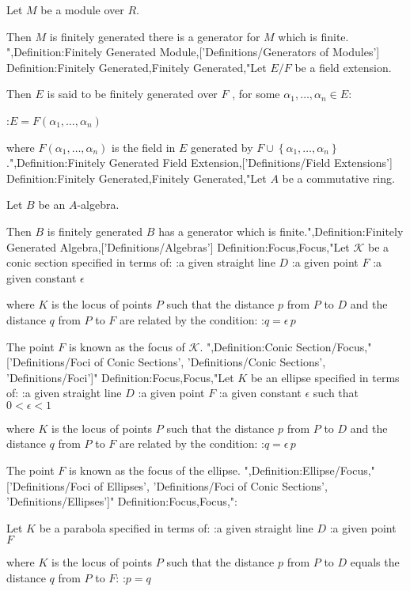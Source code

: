Let $M$ be a module over $R$.


Then $M$ is finitely generated  there is a generator for $M$ which is finite.
",Definition:Finitely Generated Module,['Definitions/Generators of Modules']
Definition:Finitely Generated,Finitely Generated,"Let $E / F$ be a field extension.


Then $E$ is said to be finitely generated over $F$ , for some $\alpha_1, \ldots, \alpha_n \in E$:

:$E = F \left({\alpha_1, \ldots, \alpha_n}\right)$ 

where $F \left({\alpha_1, \ldots, \alpha_n}\right)$ is the field in $E$ generated by $F \cup \left\{{\alpha_1, \ldots, \alpha_n}\right\}$.",Definition:Finitely Generated Field Extension,['Definitions/Field Extensions']
Definition:Finitely Generated,Finitely Generated,"Let $A$ be a commutative ring.

Let $B$ be an $A$-algebra.


Then $B$ is finitely generated  $B$ has a generator which is finite.",Definition:Finitely Generated Algebra,['Definitions/Algebras']
Definition:Focus,Focus,"Let $\mathcal K$ be a conic section specified in terms of:
:a given straight line $D$
:a given point $F$
:a given constant $\epsilon$

where $K$ is the locus of points $P$ such that the distance $p$ from $P$ to $D$ and the distance $q$ from $P$ to $F$ are related by the condition:
:$q = \epsilon \, p$


The point $F$ is known as the focus of $\mathcal K$.
",Definition:Conic Section/Focus,"['Definitions/Foci of Conic Sections', 'Definitions/Conic Sections', 'Definitions/Foci']"
Definition:Focus,Focus,"Let $K$ be an ellipse specified in terms of:
:a given straight line $D$
:a given point $F$
:a given constant $\epsilon$ such that $0 < \epsilon < 1$

where $K$ is the locus of points $P$ such that the distance $p$ from $P$ to $D$ and the distance $q$ from $P$ to $F$ are related by the condition:
:$q = \epsilon \, p$


The point $F$ is known as the focus of the ellipse.
",Definition:Ellipse/Focus,"['Definitions/Foci of Ellipses', 'Definitions/Foci of Conic Sections', 'Definitions/Ellipses']"
Definition:Focus,Focus,":


Let $K$ be a parabola specified in terms of:
:a given straight line $D$
:a given point $F$

where $K$ is the locus of points $P$ such that the distance $p$ from $P$ to $D$ equals the distance $q$ from $P$ to $F$:
:$p = q$


